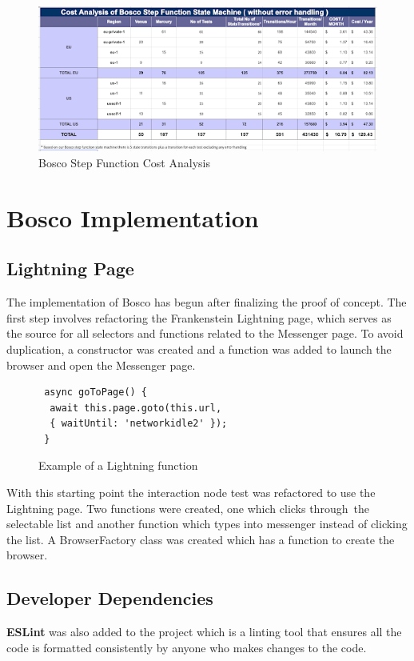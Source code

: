\documentclass[12pt,a4paper,titlepage]{report}
\begin{document}
\begin{figure}[h]
 \centering
 \includegraphics[width=15cm]{./diagrams/sf_cost_analysis}
 \caption{Bosco Step Function Cost Analysis}
\end{figure}

\chapter{Bosco Implementation}

\section{Lightning Page}
The implementation of Bosco has begun after finalizing the proof of concept. The first step involves refactoring the Frankenstein Lightning page, which serves as the source for all selectors and functions related to the Messenger page. To avoid duplication, a constructor was created and a function was added to launch the browser and open the Messenger page.

\begin{figure}[H]
 \begin{tcolorbox}
  \begin{verbatim}
 async goToPage() {
  await this.page.goto(this.url, 
  { waitUntil: 'networkidle2' });
 }
\end{verbatim}
 \end{tcolorbox}
 \caption{Example of a Lightning function}
\end{figure}

With this starting point the interaction node test was refactored to use the Lightning page. Two functions were
created, one which clicks through the selectable list and another function which types into messenger instead of
clicking the list. A BrowserFactory class was created which has a function to create the browser.

\section{Developer Dependencies}
\textbf{ESLint} was also added to the project which is a linting tool that ensures all the code is formatted consistently
by anyone who makes changes to the code.  
\end{document}
